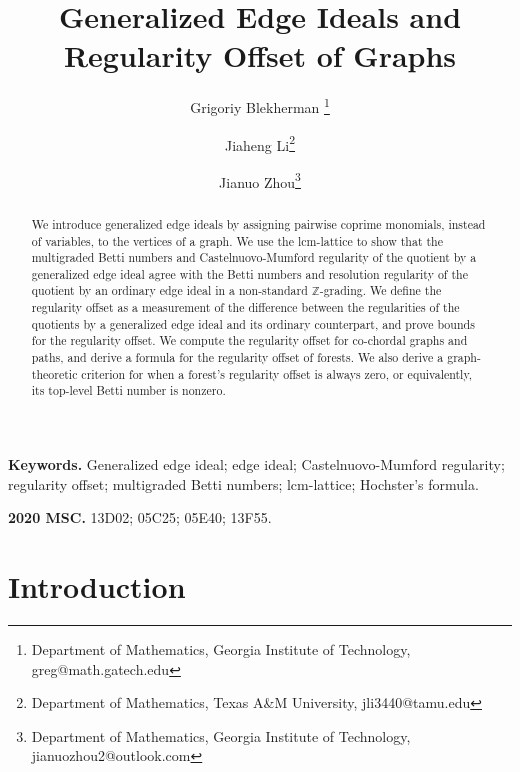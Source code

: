 \documentclass[dvipsnames,10pt]{article}
\title{\Large \textbf{Generalized Edge Ideals and Regularity Offset of Graphs}}
\author{
    Grigoriy Blekherman \thanks{Department of Mathematics, Georgia Institute of Technology, greg@math.gatech.edu} 
    \and 
    Jiaheng Li\thanks{Department of Mathematics, Texas A\&M University, jli3440@tamu.edu} 
    \and 
    Jianuo Zhou\thanks{Department of Mathematics, Georgia Institute of Technology, jianuozhou2@outlook.com} 
}
\date{}
\newcommand{\gb}[1]{{\color{red} \textup{(\!(GB: #1)\!)}}}
\begin{document}
\maketitle

\begin{abstract}
We introduce generalized edge ideals by assigning pairwise coprime monomials, instead of variables, to the vertices of a graph. We use the lcm-lattice to show that the multigraded Betti numbers and Castelnuovo-Mumford regularity of the quotient by a generalized edge ideal agree with the Betti numbers and resolution regularity of the quotient by an ordinary edge ideal in a non-standard $\mathbb{Z}$-grading. We define the regularity offset as a measurement of the difference between the regularities of the quotients by a generalized edge ideal and its ordinary counterpart, and prove bounds for the regularity offset. We compute the regularity offset for co-chordal graphs and paths, and derive a formula for the regularity offset of forests. We also derive a graph-theoretic criterion for when a forest's regularity offset is always zero, or equivalently, its top-level Betti number is nonzero.
\end{abstract}

\noindent\textbf{Keywords.} Generalized edge ideal; edge ideal; Castelnuovo-Mumford regularity; regularity offset; multigraded Betti numbers; lcm-lattice; Hochster's formula.

\medskip
\noindent\textbf{2020 MSC.} 13D02; 05C25; 05E40; 13F55.

\section{Introduction}
\end{document}
